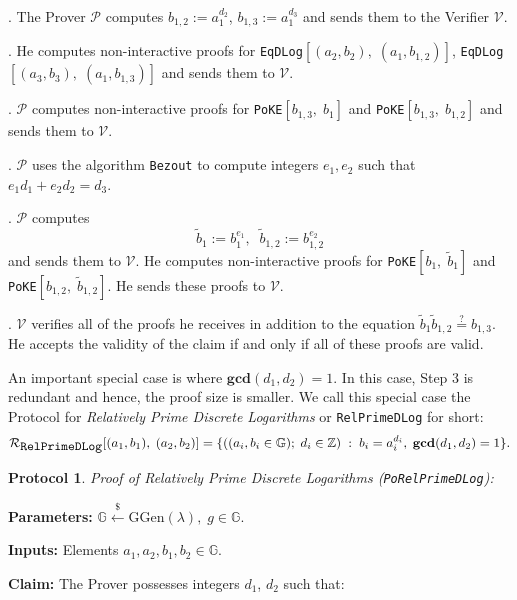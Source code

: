 \documentclass[11pt, lettersize, notitlepage, leqno, footskip=0.6cm]{article}
\newcommand{\bz}{\mathbb Z}
\newcommand{\wti}{\widetilde}
\newcommand{\mc}{\mathcal}
\newcommand{\mb}{\mathbb}
\newcommand{\mbf}{\mathbf}
\newcommand{\mr}{\mathrm}
\newcommand{\lamb}{\lambda}
\newcommand{\V}{\mc{V}}
\newcommand{\vs}{\vspace{-0.15cm}}
\newcommand{\GCD}{\mbf{gcd}}
\newtheorem{Prot}[Thm]{Protocol}
\numberwithin{equation}{section}
\begin{document}
\begin{prf1} . The Prover $\mc{P}$ computes $b_{1,2}:= a_1^{d_2}$, $b_{1,3}:= a_1^{d_3}$ and sends them to the Verifier $\V$.

. He computes non-interactive proofs for \verb|EqDLog|$[(a_2, b_2),\; (a_1, b_{1,2})]$, \verb|EqDLog|$[(a_3, b_3),\; (a_1, b_{1,3})]$ and sends them to $\mc{V}$.

. $\mc{P}$ computes non-interactive proofs for \verb|PoKE|$[b_{1,3},\;b_1 ]$ and \verb|PoKE|$[b_{1,3},\;b_{1,2} ]$ and sends them to $\V$.

. $\mc{P}$ uses the algorithm \verb|Bezout|  to compute integers $e_1, e_2$ such that $e_1d_1 + e_2d_2 = d_3$.

. $\mc{P}$ computes \vs $$\wti{b}_1:= b_1^{e_1},\;\; \wti{b}_{1,2}:= b_{1,2}^{e_2} $$ and sends them to $\V$. He computes non-interactive proofs for \verb|PoKE|$[b_1,\; \wti{b}_1]$ and \verb|PoKE|$[b_{1,2},\; \wti{b}_{1,2}]$. He sends these proofs to $\mc{V}$.

. $\mc{V}$ verifies all of the proofs he receives in addition to the equation $\wti{b}_1\wti{b}_{1,2}\stackrel{?}{=} b_{1,3}$. He accepts the validity of the claim if and only if all of these proofs are valid.\end{prf1}

\noindent An important special case is where $\GCD(d_1, d_2) = 1$. In this case, Step 3 is redundant and hence, the proof size is smaller. We call this special case the Protocol for \textit{Relatively Prime Discrete Logarithms} or \verb|RelPrimeDLog| for short: $$\mc{R}_{{\protect\verb|RelPrimeDLog|}}[(a_1,b_1),\;(a_2,b_2)] = \{((a_i, b_i\in\mb{G});\;d_i\in\bz)\;:\; b_i = a_i^{d_i},\;\GCD(d_1,d_2)=1 \} .$$ 

\vspace{0.1cm}

\begin{Prot} \normalfont \textit{Proof of Relatively Prime Discrete Logarithms} (\verb|PoRelPrimeDLog|):\end{Prot} \vspace{-0.3cm}

\noindent \textbf{Parameters:} $\mb{G}\xleftarrow{\$} \mr{GGen}(\lamb), \; g\in \mb{G}$.

\noindent \textbf{Inputs:} Elements $a_1, a_2, b_1, b_2 \in \mb{G}$.

\noindent \textbf{Claim:} The Prover possesses integers $d_1$, $d_2$ such that:
\end{document}

